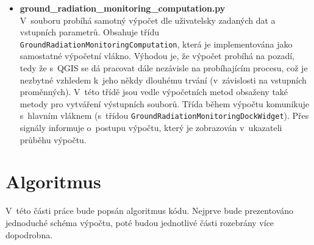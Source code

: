 \begin{itemize}
	\item \textbf{ground\_radiation\_monitoring\_computation.py} \\
		V~souboru probíhá samotný výpočet dle uživatelsky zadaných dat a vstupních parametrů. Obsahuje třídu \texttt{GroundRadiationMonitoringComputation}, která je implementována jako samostatné výpočetní vlákno. Výhodou je, že výpočet probíhá na pozadí, tedy že s~QGIS se dá pracovat dále nezávisle na probíhajícím procesu, což je nezbytné vzhledem k~jeho někdy dlouhému trvání (v~závislosti na vstupních proměnných). V~této třídě jsou vedle výpočetních metod obsaženy také metody pro vytváření výstupních souborů. Třída během výpočtu komunikuje s~hlavním vláknem (s~třídou \texttt{GroundRadiationMonitoringDockWidget}). Přes signály informuje o~postupu výpočtu, který je zobrazován v~ukazateli průběhu výpočtu.
	
\end{itemize}

\newpage
\section{Algoritmus}
V~této části práce bude popsán algoritmus kódu. Nejprve bude prezentováno jednoduché schéma výpočtu, poté budou jednotlivé části rozebrány více dopodrobna.
